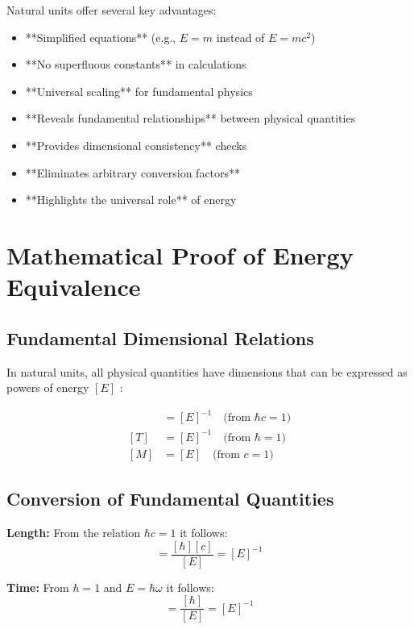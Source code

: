 \documentclass[11pt,a4paper]{article}
\begin{document}
	Natural units offer several key advantages:
	\begin{itemize}
		\item **Simplified equations** (e.g., $E = m$ instead of $E = mc^2$)
		\item **No superfluous constants** in calculations
		\item **Universal scaling** for fundamental physics
		\item **Reveals fundamental relationships** between physical quantities
		\item **Provides dimensional consistency** checks
		\item **Eliminates arbitrary conversion factors**
		\item **Highlights the universal role** of energy
	\end{itemize}
	
	\section{Mathematical Proof of Energy Equivalence}
	
	\subsection{Fundamental Dimensional Relations}
	
	In natural units, all physical quantities have dimensions that can be expressed as powers of energy $[E]$ \cite{weinberg1995,peskin1995}:
	
	\begin{align}
		[L] &= [E]^{-1} \quad \text{(from } \hbar c = 1\text{)} \\
		[T] &= [E]^{-1} \quad \text{(from } \hbar = 1\text{)} \\
		[M] &= [E] \quad \text{(from } c = 1\text{)}
	\end{align}
	
	\subsection{Conversion of Fundamental Quantities}
	
	\textbf{Length:} From the relation $\hbar c = 1$ it follows:
	\begin{equation}
		[L] = \frac{[\hbar][c]}{[E]} = [E]^{-1}
	\end{equation}
	
	\textbf{Time:} From $\hbar = 1$ and $E = \hbar \omega$ it follows:
	\begin{equation}
		[T] = \frac{[\hbar]}{[E]} = [E]^{-1}
	\end{equation}
	
\end{document}
